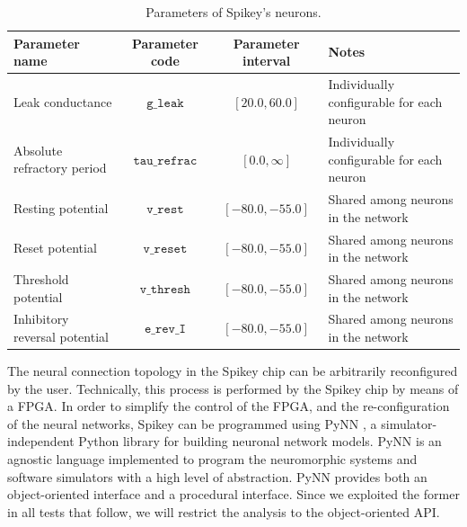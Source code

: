 \documentclass[utf8]{frontiersFPHY} %
\begin{document}
\begin{table}[htbp]
	\caption{Parameters of Spikey's neurons.}

	\label{tab:parameters}

	\centering
	\small
	\begin{tabularx}{\textwidth}{l|c|c|X}
	\hline
	\textbf{Parameter name}  & \textbf{Parameter code} & \textbf{Parameter interval} & \textbf{Notes} \\
	\hline
	\hline
		Leak conductance	 & $\texttt{g\_leak}$ &  $[20.0, 60.0]$ & Individually configurable for each neuron \\
	\hline
		Absolute refractory period	 & $\texttt{tau\_refrac}$ &  $[0.0, \infty]$ & Individually configurable for each neuron \\
	\hline
		Resting potential 	&  $\texttt{v\_rest}$ & 	$[-80.0, -55.0]$ &	Shared among neurons in the network\\
	\hline
		Reset potential 	&  $\texttt{v\_reset}$ & 	$[-80.0, -55.0]$ &	Shared among neurons in the network\\
	\hline
		Threshold potential 	&  $\texttt{v\_thresh}$ & 	$[-80.0, -55.0]$ &	Shared among neurons in the network\\
	\hline
		Inhibitory reversal potential 	&  $\texttt{e\_rev\_I}$ & $[-80.0, -55.0]$ &	Shared among neurons in the network\\
	\hline

	\end{tabularx}
\end{table}

The neural connection topology in the Spikey chip can be arbitrarily reconfigured by the user.
Technically, this process is performed by the Spikey chip by means of a FPGA. 
In order to simplify the control of the FPGA, and the re-configuration of the neural networks, Spikey can be programmed using PyNN \cite{Davison2009}, a simulator-independent Python library for building neuronal network models. 
PyNN is an agnostic language implemented to program the neuromorphic systems and software simulators with a high level of abstraction. 
PyNN provides both an object-oriented interface and a procedural interface. 
Since we exploited the former in all tests that follow, we will restrict the analysis to the object-oriented API. 
\end{document}
